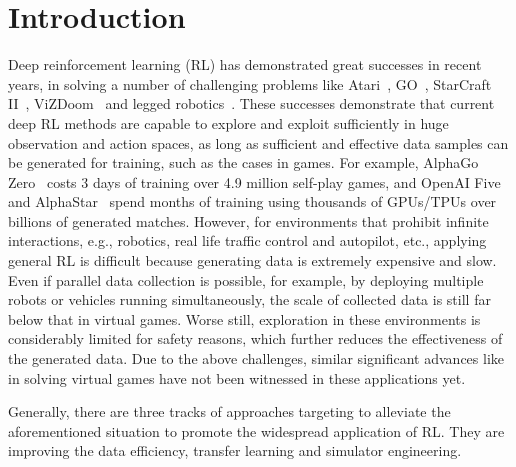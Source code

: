 \documentclass[letterpaper]{article} %
\begin{document}
\section{Introduction}
Deep reinforcement learning (RL) has demonstrated great successes in recent years, in solving a number of challenging problems like Atari~\citep{mnih2015human}, GO~\citep{silver2016mastering,silver2017mastering},
StarCraft II~\citep{astar,han2020tstarbot}, ViZDoom~\citep{li2023fittest} and legged robotics~\cite{han2023lifelike}.
These successes demonstrate that current deep RL methods are capable to explore and exploit sufficiently in huge observation and action spaces, as long as sufficient and effective data samples can be generated for training, such as the cases in games. For example, AlphaGo Zero~\citep{silver2017mastering} costs 3 days of training over 4.9 million self-play games, and OpenAI Five~\citep{OpenAI_dota} and AlphaStar~\citep{astar} spend months of training using thousands of GPUs/TPUs over billions of generated matches.
However, for environments that prohibit infinite interactions, e.g., robotics, real life traffic control and autopilot, etc., applying general RL is difficult because generating data is extremely expensive and slow. Even if parallel data collection is possible, for example, by deploying multiple robots or vehicles running simultaneously, the scale of collected data is still far below that in virtual games. Worse still, exploration in these environments is considerably limited for safety reasons, which further reduces the effectiveness of the generated data. Due to the above challenges, similar significant advances like in solving virtual games have not been witnessed in these applications yet.

Generally, there are three tracks of approaches targeting to alleviate the aforementioned situation to promote the widespread application of RL. They are improving the data efficiency, transfer learning and simulator engineering.
\end{document}
